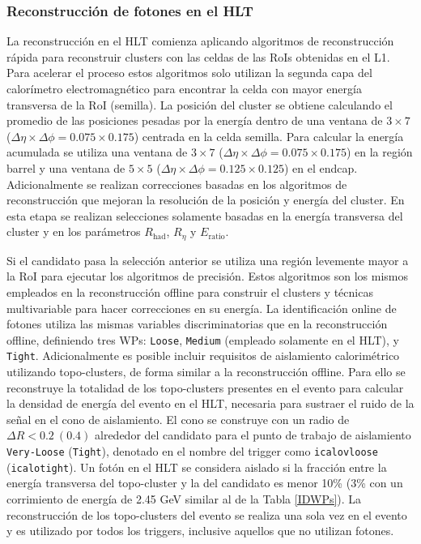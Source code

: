 \subsubsection{Reconstrucción de fotones en el HLT}

La reconstrucción en el HLT comienza aplicando algoritmos de reconstrucción rápida para reconstruir clusters con las celdas de las RoIs obtenidas en el L1. Para acelerar el proceso estos algoritmos solo utilizan la segunda capa del calorímetro electromagnético para encontrar la celda con mayor energía transversa de la RoI (semilla). La posición del cluster se obtiene calculando el promedio de las posiciones pesadas por la energía
dentro de una ventana de $3\times7$ ($\Delta\eta\times\Delta\phi = 0.075\times0.175$) centrada en la celda semilla. Para calcular la energía acumulada 
se utiliza una ventana de $3\times7$ ($\Delta\eta\times\Delta\phi = 0.075\times0.175$) en la región barrel y una ventana de $5\times5$ ($\Delta\eta\times\Delta\phi = 0.125\times0.125$) en el endcap. Adicionalmente se realizan correcciones basadas en los algoritmos de reconstrucción que mejoran la resolución de la posición y energía del cluster. En esta etapa se realizan selecciones solamente basadas en la energía transversa del cluster y en los parámetros $R_{\text{had}}$, $R_{\eta}$ y $E_{\text{ratio}}$.


Si el candidato pasa la selección anterior se utiliza una región levemente mayor a la RoI para ejecutar los algoritmos de precisión. Estos algoritmos son los mismos empleados en la reconstrucción offline \cite{Lampl:1099735} para construir el clusters y técnicas multivariable \cite{PERF-2017-03} para hacer correcciones en su energía. La identificación online de fotones utiliza las mismas variables discriminatorias que en la reconstrucción offline, definiendo tres WPs: \texttt{Loose}, \texttt{Medium} (empleado solamente en el HLT), y \texttt{Tight}.
Adicionalmente es posible incluir requisitos de aislamiento calorimétrico utilizando topo-clusters, de forma similar a la reconstrucción offline. Para ello se reconstruye la totalidad de los topo-clusters presentes en el evento para calcular la densidad de energía del evento en el HLT, necesaria para sustraer el ruido de la señal en el cono de aislamiento. El cono se construye con un radio de  $\Delta R < 0.2\:(0.4)$ alrededor del candidato para el punto de trabajo de aislamiento \texttt{Very-Loose} (\texttt{Tight}), denotado en el nombre del trigger como \texttt{icalovloose} (\texttt{icalotight}). Un fotón en el HLT se considera aislado si la fracción entre la energía transversa del topo-cluster y la del candidato es menor
10\% (3\% con un corrimiento de energía de 2.45 GeV similar al de la Tabla \ref{IDWPs}). La reconstrucción de los topo-clusters del evento se realiza una sola vez en el evento y es utilizado por todos los triggers, inclusive aquellos que no utilizan fotones.

